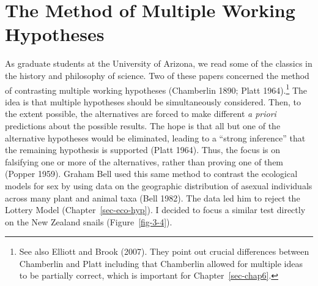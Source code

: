 \documentclass[
  letterpaper,
]{book}
\begin{document}
\section{The Method of Multiple Working
Hypotheses}\label{the-method-of-multiple-working-hypotheses}

As graduate students at the University of Arizona, we read some of the
classics in the history and philosophy of science. Two of these papers
concerned the method of contrasting multiple working hypotheses
(Chamberlin 1890; Platt 1964).\footnote{See also Elliott and Brook
  (2007). They point out crucial differences between Chamberlin and
  Platt including that Chamberlin allowed for multiple ideas to be
  partially correct, which is important for Chapter~\ref{sec-chap6}.}
The idea is that multiple hypotheses should be simultaneously
considered. Then, to the extent possible, the alternatives are forced to
make different \emph{a priori} predictions about the possible results.
The hope is that all but one of the alternative hypotheses would be
eliminated, leading to a ``strong inference'' that the remaining
hypothesis is supported (Platt 1964). Thus, the focus is on falsifying
one or more of the alternatives, rather than proving one of them (Popper
1959). Graham Bell used this same method to contrast the ecological
models for sex by using data on the geographic distribution of asexual
individuals across many plant and animal taxa (Bell 1982). The data led
him to reject the Lottery Model (Chapter~\ref{sec-eco-hyp}). I decided
to focus a similar test directly on the New Zealand snails
(Figure~\ref{fig-3-4}).
\end{document}
